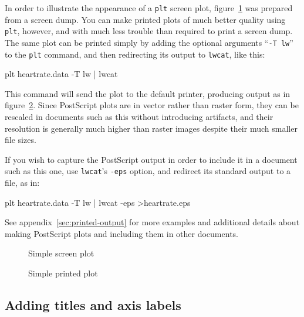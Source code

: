 \documentclass{book}
\begin{document}
In order to illustrate the appearance of a {\tt plt} screen plot,
figure~\ref{fig:simple0} was prepared from a screen dump.  You can
make printed plots of much better quality using {\tt plt}, however,
and with much less trouble than required to print a screen dump.  The
same plot can be printed simply by adding the optional arguments
``{\tt -T lw}'' to the {\tt plt} command, and then redirecting its
output to {\tt lwcat}, like this:

\begin{center}
\begin{boxedverbatim}
plt heartrate.data -T lw | lwcat
\end{boxedverbatim}
\end{center}

This command will send the plot to the default printer, producing
output as in figure~\ref{fig:simple1}.  Since PostScript plots are
in vector rather than raster form, they can be rescaled in documents
such as this without introducing artifacts, and their resolution is
generally much higher than raster images despite their much smaller file
sizes.

If you wish to capture the PostScript output in order to include it in
a document such as this one, use {\tt lwcat}'s {\tt -eps} option, and
redirect its standard output to a file, as in:

\begin{center}
\begin{boxedverbatim}
plt heartrate.data -T lw | lwcat -eps >heartrate.eps
\end{boxedverbatim}
\end{center}

See appendix~\ref{sec:printed-output} for more examples and additional
details about making PostScript plots and including them in other
documents.

\begin{figure}
\begin{center}
\caption{Simple screen plot \label{fig:simple0}}
\end{center}
\end{figure}
\begin{figure}
\begin{center}
\caption{Simple printed plot \label{fig:simple1}}
\end{center}
\end{figure}

\subsection{Adding titles and axis labels}
\end{document}
